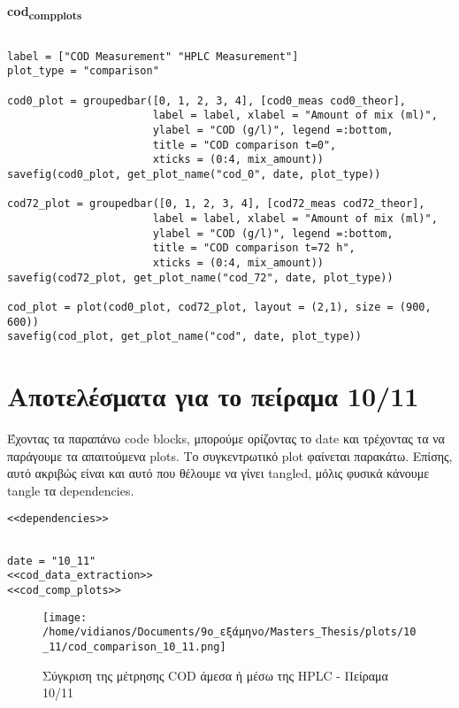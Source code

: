 \documentclass[11pt]{article}
\begin{document}
\textbf{cod\textsubscript{comp}\textsubscript{plots}}
\begin{verbatim}

label = ["COD Measurement" "HPLC Measurement"]
plot_type = "comparison"

cod0_plot = groupedbar([0, 1, 2, 3, 4], [cod0_meas cod0_theor],
                       label = label, xlabel = "Amount of mix (ml)",
                       ylabel = "COD (g/l)", legend =:bottom,
                       title = "COD comparison t=0",
                       xticks = (0:4, mix_amount))
savefig(cod0_plot, get_plot_name("cod_0", date, plot_type))

cod72_plot = groupedbar([0, 1, 2, 3, 4], [cod72_meas cod72_theor],
                       label = label, xlabel = "Amount of mix (ml)",
                       ylabel = "COD (g/l)", legend =:bottom,
                       title = "COD comparison t=72 h",
                       xticks = (0:4, mix_amount))
savefig(cod72_plot, get_plot_name("cod_72", date, plot_type))

cod_plot = plot(cod0_plot, cod72_plot, layout = (2,1), size = (900, 600))
savefig(cod_plot, get_plot_name("cod", date, plot_type))

\end{verbatim}

\section{Αποτελέσματα για το πείραμα 10/11}
\label{sec:org18fdf75}
Έχοντας τα παραπάνω code blocks, μπορούμε ορίζοντας το date και τρέχοντας τα να παράγουμε τα απαιτούμενα plots. Το συγκεντρωτικό plot φαίνεται παρακάτω. Επίσης, αυτό ακριβώς είναι και αυτό που θέλουμε να γίνει tangled, μόλις φυσικά κάνουμε tangle τα dependencies.

\begin{verbatim}
<<dependencies>>
\end{verbatim}

\begin{verbatim}

date = "10_11"
<<cod_data_extraction>>
<<cod_comp_plots>>

\end{verbatim}

\begin{figure}[htbp]
\centering
\texttt{[image: /home/vidianos/Documents/9o\_εξάμηνο/Masters\_Thesis/plots/10\_11/cod\_comparison\_10\_11.png]}
\caption{Σύγκριση της μέτρησης COD άμεσα ή μέσω της HPLC - Πείραμα 10/11}
\end{figure}
\end{document}
